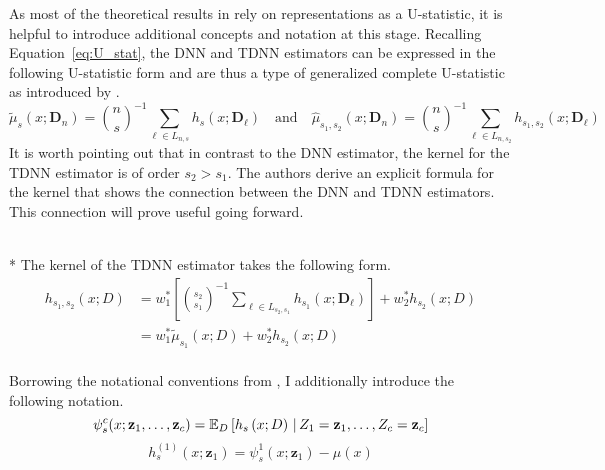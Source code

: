 As most of the theoretical results in \citet{demirkaya_optimal_2024} rely on representations as a U-statistic, it is helpful to introduce additional concepts and notation at this stage.
Recalling Equation~\ref{eq:U_stat}, the DNN and TDNN estimators can be expressed in the following U-statistic form and are thus a type of generalized complete U-statistic as introduced by \citet{peng_rates_2022}.
\begin{equation}
	\tilde{\mu}_{s}(x; \mathbf{D}_n)
	= \binom{n}{s}^{-1} \sum_{\ell \in L_{n,s}} h_{s}(x; \mathbf{D}_{\ell})
	\quad \text{and} \quad
	\hat{\mu}_{s_1, s_2}(x; \mathbf{D}_n)
	= \binom{n}{s}^{-1} \sum_{\ell \in L_{n,s_2}} h_{s_1, s_2}(x; \mathbf{D}_{\ell})
\end{equation}
It is worth pointing out that in contrast to the DNN estimator, the kernel for the TDNN estimator is of order $s_2 > s_1$.
The authors derive an explicit formula for the kernel that shows the connection between the DNN and TDNN estimators.
This connection will prove useful going forward.
\begin{boxD}
	\begin{lem}\label{lem:dem8}\mbox{}\\*
		The kernel of the TDNN estimator takes the following form.
		\begin{equation}
			\begin{aligned}
				h_{s_1, s_2}\left(x; D\right)
				 & = w_{1}^{*}\left[\binom{s_2}{s_1}^{-1}\sum_{\ell \in L_{s_2, s_1}} h_{s_1}\left(x; \mathbf{D}_{\ell}\right)\right] + w_{2}^{*} h_{s_2}\left(x; D\right) \\
				 & = w_{1}^{*} \tilde{\mu}_{s_1}\left(x; D\right) + w_{2}^{*} h_{s_2}\left(x; D\right)                                                            \\
			\end{aligned}
		\end{equation}
	\end{lem}
\end{boxD}
Borrowing the notational conventions from \citet{lee_u-statistics_2019}, I additionally introduce the following notation.
\begin{equation}\label{eq:psi_s_c}
	\psi_{s}^{c}(x; \mathbf{z}_{1}, \dotsc, \mathbf{z}_{c})
	= \mathbb{E}_{D}\left[h_{s}\left(x; D\right) \, | \,  Z_1 = \mathbf{z}_{1}, \dotsc, Z_c = \mathbf{z}_{c}\right]
\end{equation}
\begin{equation}
	h_{s}^{(1)}\left(x; \mathbf{z}_{1}\right)
	= \psi_{s}^{1}(x; \mathbf{z}_{1}) - \mu(x)
\end{equation}
